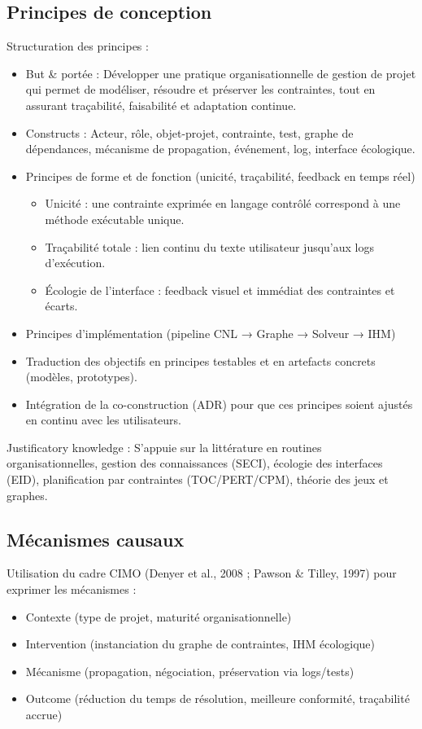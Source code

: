 \documentclass[a4paper,12pt]{article}
\begin{document}
\subsection{Principes de conception}
\label{sec:org5f60b27}
Structuration des principes \autocite[\& Jones (2007)]{Gregor} :
\begin{itemize}
\item But \& portée : Développer une pratique organisationnelle de gestion de projet qui permet de modéliser, résoudre et préserver les contraintes, tout en assurant traçabilité, faisabilité et adaptation continue.
\item Constructs : Acteur, rôle, objet-projet, contrainte, test, graphe de dépendances, mécanisme de propagation, événement, log, interface écologique.
\item Principes de forme et de fonction (unicité, traçabilité, feedback en temps réel)
\begin{itemize}
\item Unicité : une contrainte exprimée en langage contrôlé correspond à une méthode exécutable unique.
\item Traçabilité totale : lien continu du texte utilisateur jusqu’aux logs d’exécution.
\item Écologie de l’interface : feedback visuel et immédiat des contraintes et écarts.
\end{itemize}
\item Principes d’implémentation (pipeline CNL → Graphe → Solveur → IHM)
\item Traduction des objectifs en principes testables et en artefacts concrets (modèles, prototypes).
\item Intégration de la co-construction (ADR) pour que ces principes soient ajustés en continu avec les utilisateurs.
\end{itemize}

Justificatory knowledge : S’appuie sur la littérature en routines organisationnelles, gestion des connaissances (SECI), écologie des interfaces (EID), planification par contraintes (TOC/PERT/CPM), théorie des jeux et graphes.
\subsection{Mécanismes causaux}
\label{sec:orgc867975}
Utilisation du cadre CIMO (Denyer et al., 2008 ; Pawson \& Tilley, 1997) pour exprimer les mécanismes :
\begin{itemize}
\item Contexte (type de projet, maturité organisationnelle)
\item Intervention (instanciation du graphe de contraintes, IHM écologique)
\item Mécanisme (propagation, négociation, préservation via logs/tests)
\item Outcome (réduction du temps de résolution, meilleure conformité, traçabilité accrue)
\end{itemize}
\end{document}

